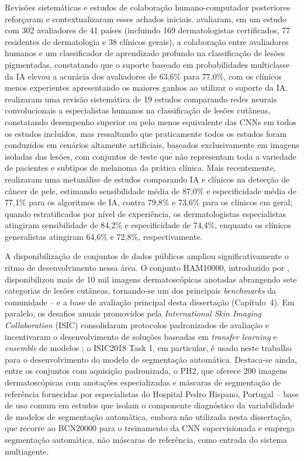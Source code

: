 Revisões sistemáticas e estudos de colaboração humano-computador posteriores reforçaram e contextualizaram esses achados iniciais.  avaliaram, em um estudo com 302 avaliadores de 41 países (incluindo 169 dermatologistas certificados, 77 residentes de dermatologia e 38 clínicos gerais), a colaboração entre avaliadores humanos e um classificador de aprendizado profundo na classificação de lesões pigmentadas, constatando que o suporte baseado em probabilidades multiclasse da IA elevou a acurácia dos avaliadores de 63,6\% para 77,0\%, com os clínicos menos experientes apresentando os maiores ganhos ao utilizar o suporte da IA.  realizaram uma revisão sistemática de 19 estudos comparando redes neurais convolucionais a especialistas humanos na classificação de lesões cutâneas, constatando desempenho superior ou pelo menos equivalente das CNNs em todos os estudos incluídos, mas ressaltando que praticamente todos os estudos foram conduzidos em cenários altamente artificiais, baseados exclusivamente em imagens isoladas das lesões, com conjuntos de teste que não representam toda a variedade de pacientes e subtipos de melanoma da prática clínica. Mais recentemente,  realizaram uma metanálise de estudos comparando IA e clínicos na detecção de câncer de pele, estimando sensibilidade média de 87,0\% e especificidade média de 77,1\% para os algoritmos de IA, contra 79,8\% e 73,6\% para os clínicos em geral; quando estratificados por nível de experiência, os dermatologistas especialistas atingiram sensibilidade de 84,2\% e especificidade de 74,4\%, enquanto os clínicos generalistas atingiram 64,6\% e 72,8\%, respectivamente.

A disponibilização de conjuntos de dados públicos ampliou significativamente o ritmo de desenvolvimento nessa área. O conjunto HAM10000, introduzido por , disponibilizou mais de 10 mil imagens dermatoscópicas anotadas abrangendo sete categorias de lesões cutâneas, tornando-se um dos principais \textit{benchmarks} da comunidade -- e a base de avaliação principal desta dissertação (Capítulo~4). Em paralelo, os desafios anuais promovidos pela \textit{International Skin Imaging Collaboration} (ISIC) consolidaram protocolos padronizados de avaliação e incentivaram o desenvolvimento de soluções baseadas em \textit{transfer learning} e \textit{ensemble} de modelos \cite{codella2019skin}; o ISIC2018 Task 1, em particular, é usado neste trabalho para o desenvolvimento do modelo de segmentação automática. Destaca-se ainda, entre os conjuntos com aquisição padronizada, o PH2, que oferece 200 imagens dermatoscópicas com anotações especializadas e máscaras de segmentação de referência fornecidas por especialistas do Hospital Pedro Hispano, Portugal \cite{mendonca2013ph2} -- base de uso comum em estudos que isolam o componente diagnóstico da variabilidade de modelos de segmentação automática, embora não utilizada nesta dissertação, que recorre ao BCN20000 \cite{combalia2019bcn20000} para o treinamento da CNN supervisionada e emprega segmentação automática, não máscaras de referência, como entrada do sistema multiagente.


